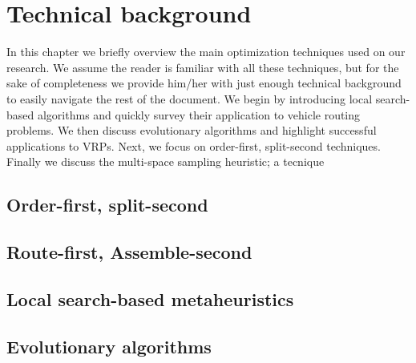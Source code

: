 \chapter{Technical background}
In this chapter we briefly overview the main optimization techniques used on our research. We assume the reader is familiar with all these techniques, but for the sake of completeness we provide him/her with just enough technical background to easily navigate the rest of the document. We begin by introducing local search-based algorithms and quickly survey their application to vehicle routing problems. We then discuss evolutionary algorithms and highlight successful applications to VRPs. Next, we focus on order-first, split-second techniques. Finally we discuss the multi-space sampling heuristic; a tecnique  

\section{Order-first, split-second}

\section{Route-first, Assemble-second}

\section{Local search-based metaheuristics}

\section{Evolutionary algorithms}
